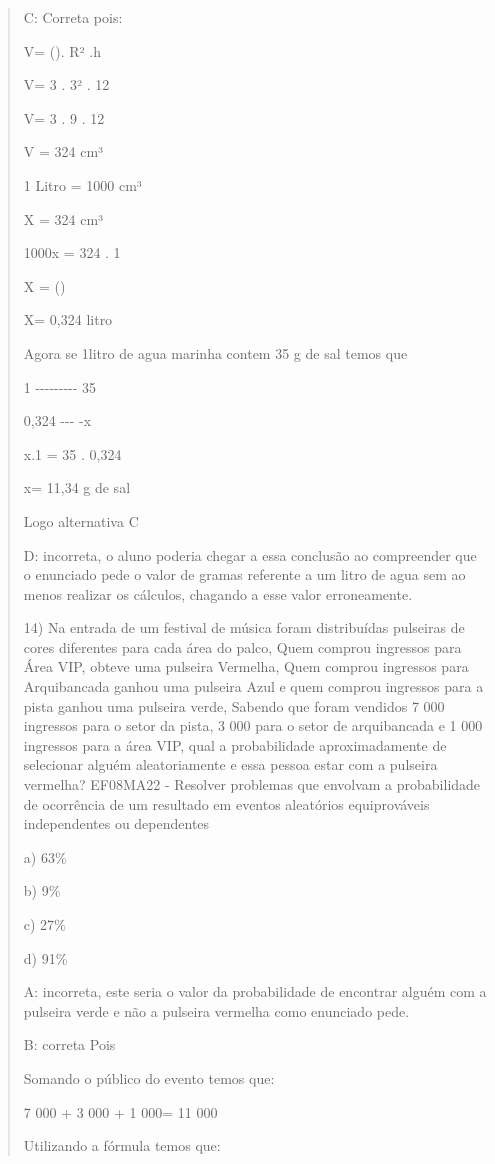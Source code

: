 \begin{quote}
\begin{escolha}
C: Correta pois:

V= (\Pi). R² .h

V= 3 . 3² . 12

V= 3 . 9 . 12

V = 324 cm³

1 Litro = 1000 cm³

X = 324 cm³

1000x = 324 . 1

X = ()

X= 0,324 litro

Agora se 1litro de agua marinha contem 35 g de sal temos que

1 -\/-\/-\/-\/-\/-\/-\/-\/- 35

0,324 -\/-\/- -x

x.1 = 35 . 0,324

x= 11,34 g de sal

Logo alternativa C

D: incorreta, o aluno poderia chegar a essa conclusão ao compreender que
o enunciado pede o valor de gramas referente a um litro de agua sem ao
menos realizar os cálculos, chagando a esse valor erroneamente.

14) Na entrada de um festival de música foram distribuídas pulseiras de
cores diferentes para cada área do palco, Quem comprou ingressos para
Área VIP, obteve uma pulseira Vermelha, Quem comprou ingressos para
Arquibancada ganhou uma pulseira Azul e quem comprou ingressos para a
pista ganhou uma pulseira verde, Sabendo que foram vendidos 7 000
ingressos para o setor da pista, 3 000 para o setor de arquibancada e 1
000 ingressos para a área VIP, qual a probabilidade aproximadamente de
selecionar alguém aleatoriamente e essa pessoa estar com a pulseira
vermelha? EF08MA22 - Resolver problemas que envolvam a probabilidade de
ocorrência de um resultado em eventos aleatórios equiprováveis
independentes ou dependentes

a) 63\%

b) 9\%

c) 27\%

d) 91\%

A: incorreta, este seria o valor da probabilidade de encontrar alguém
com a pulseira verde e não a pulseira vermelha como enunciado pede.

B: correta Pois

Somando o público do evento temos que:

7 000 + 3 000 + 1 000= 11 000

Utilizando a fórmula temos que:


\end{escolha}
\end{quote}
